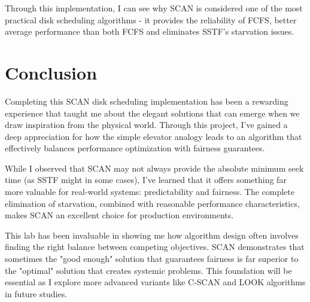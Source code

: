 \documentclass[12pt,a4paper]{article}
\begin{document}
Through this implementation, I can see why SCAN is considered one of the most practical disk scheduling algorithms - it provides the reliability of FCFS, better average performance than both FCFS and eliminates SSTF's starvation issues.

\section{Conclusion}
Completing this SCAN disk scheduling implementation has been a rewarding experience that taught me about the elegant solutions that can emerge when we draw inspiration from the physical world. Through this project, I've gained a deep appreciation for how the simple elevator analogy leads to an algorithm that effectively balances performance optimization with fairness guarantees.

While I observed that SCAN may not always provide the absolute minimum seek time (as SSTF might in some cases), I've learned that it offers something far more valuable for real-world systems: predictability and fairness. The complete elimination of starvation, combined with reasonable performance characteristics, makes SCAN an excellent choice for production environments.

This lab has been invaluable in showing me how algorithm design often involves finding the right balance between competing objectives. SCAN demonstrates that sometimes the "good enough" solution that guarantees fairness is far superior to the "optimal" solution that creates systemic problems. This foundation will be essential as I explore more advanced variants like C-SCAN and LOOK algorithms in future studies.
\end{document}
